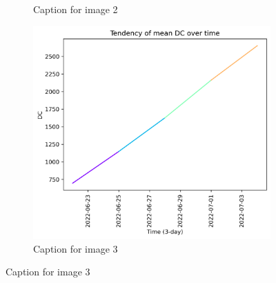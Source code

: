 \begin{figure}[h]
\begin{subfigure}{0.3\textwidth}
        \caption{Caption for image 2}
        \label{fig:img2}
    \end{subfigure}
    \hfill
    \begin{subfigure}{0.3\textwidth}
        \centering
        \includegraphics[width=\textwidth]{graphs/2022/tendency/2022_tendency_graph_DC.png}
        \caption{Caption for image 3}
        \label{fig:img3}
    \end{subfigure}
    
    \label{fig:all_images}
\end{figure}

